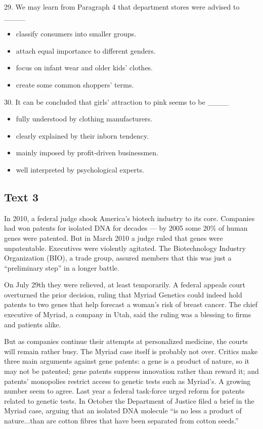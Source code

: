 \documentclass[UTF8,11pt]{ctexart}
\begin{document}
29. We may learn from Paragraph 4 that department stores were advised to \_\_\_\_


\begin{itemize}[leftmargin=2em,itemsep=.2em,topsep=.4em]\item[A.] classify consumers into smaller groups.
\item[B.] attach equal importance to different genders.
\item[C.] focus on infant wear and older kids’ clothes.
\item[D.] create some common shoppers’ terms.
\end{itemize}

30. It can be concluded that girls’ attraction to pink seems to be \_\_\_\_


\begin{itemize}[leftmargin=2em,itemsep=.2em,topsep=.4em]\item[A.] fully understood by clothing manufacturers.
\item[B.] clearly explained by their inborn tendency.
\item[C.] mainly imposed by profit-driven businessmen.
\item[D.] well interpreted by psychological experts.
\end{itemize}

\subsection*{\textbf{Text 3}}


In 2010, a federal judge shook America’s biotech industry to its core. Companies had won patents for isolated DNA for decades — by 2005 some 20\% of human genes were patented. But in March 2010 a judge ruled that genes were unpatentable. Executives were violently agitated. The Biotechnology Industry Organization (BIO), a trade group, assured members that this was just a “preliminary step” in a longer battle.


On July 29th they were relieved, at least temporarily. A federal appeals court overturned the prior decision, ruling that Myriad Genetics could indeed hold patents to two genes that help forecast a woman’s risk of breast cancer. The chief executive of Myriad, a company in Utah, said the ruling was a blessing to firms and patients alike.


But as companies continue their attempts at personalized medicine, the courts will remain rather busy. The Myriad case itself is probably not over. Critics make three main arguments against gene patents: a gene is a product of nature, so it may not be patented; gene patents suppress innovation rather than reward it; and patents’ monopolies restrict access to genetic tests such as Myriad’s. A growing number seem to agree. Last year a federal task-force urged reform for patents related to genetic tests. In October the Department of Justice filed a brief in the Myriad case, arguing that an isolated DNA molecule “is no less a product of nature...than are cotton fibres that have been separated from cotton seeds.”
\end{document}
